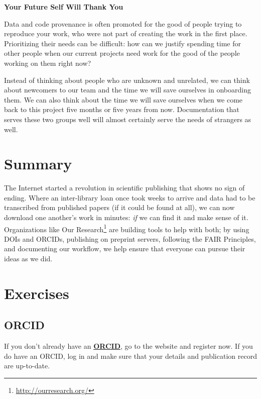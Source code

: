 \documentclass[
]{krantz}
\renewenvironment{quote}{\begin{VF}}{\end{VF}}
\renewcommand{\href}[2]{#2\footnote{\url{#1}}}
\newcommand{\gref}[2]{\hyperlink{#2}{\textbf{#1}}}
\begin{document}
\begin{quote}
\textbf{Your Future Self Will Thank You}

Data and code provenance is often promoted for the good of people
trying to reproduce your work,
who were not part of creating the work in the first place.
Prioritizing their needs can be difficult:
how can we justify spending time for other people
when our current projects need work for the good of the people working on them right now?

Instead of thinking about people who are unknown and unrelated,
we can think about newcomers to our team
and the time we will save ourselves in onboarding them.
We can also think about the time we will save ourselves
when we come back to this project five months or five years from now.
Documentation that serves these two groups well
will almost certainly serve the needs of strangers as well.
\end{quote}

\hypertarget{provenance-summary}{%
\section{Summary}\label{provenance-summary}}

The Internet started a revolution in scientific publishing
that shows no sign of ending.
Where an inter-library loan once took weeks to arrive
and data had to be transcribed from published papers
(if it could be found at all),
we can now download one another's work in minutes:
\emph{if} we can find it and make sense of it.
Organizations like \href{http://ourresearch.org/}{Our Research} are building tools to help with both;
by using DOIs and ORCIDs,
publishing on preprint servers,
following the FAIR Principles,
and documenting our workflow,
we help ensure that everyone can pursue their ideas as we did.

\hypertarget{provenance-exercises}{%
\section{Exercises}\label{provenance-exercises}}

\hypertarget{provenance-ex-get-orcid}{%
\subsection{ORCID}\label{provenance-ex-get-orcid}}

If you don't already have an \gref{ORCID}{orcid},
go to the website and register now.
If you do have an ORCID,
log in and make sure that your details and publication record are up-to-date.
\end{document}
